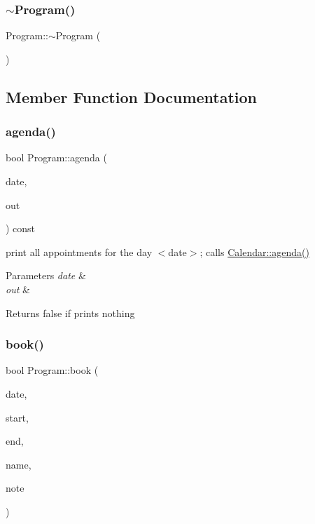 \mbox{\label{classProgram_a986aef1c50e1d338a3315a47ba6df549}} 
\subsubsection{\texorpdfstring{$\sim$\+Program()}{~Program()}}
{\footnotesize\ttfamily Program\+::$\sim$\+Program (\begin{DoxyParamCaption}{ }\end{DoxyParamCaption})}



\subsection{Member Function Documentation}
\mbox{\label{classProgram_a36916661bfce488ed07dbc2a7f3fadce}} 
\subsubsection{\texorpdfstring{agenda()}{agenda()}}
{\footnotesize\ttfamily bool Program\+::agenda (\begin{DoxyParamCaption}\item[{\hyperlink{classDate}{Date} const \&}]{date,  }\item[{std\+::ostream \&}]{out }\end{DoxyParamCaption}) const}

print all appointments for the day $<$date$>$; calls \hyperlink{classCalendar_ac6112aa4e9b3e6e5b9a478ff66789d77}{Calendar\+::agenda()} 
\begin{DoxyParams}{Parameters}
{\em date} & \\
\hline
{\em out} & \\
\hline
\end{DoxyParams}
\begin{DoxyReturn}{Returns}
false if prints nothing 
\end{DoxyReturn}
\mbox{\label{classProgram_a3fd5b4cf3d1eaa58809f593ccdc7a2d3}} 
\subsubsection{\texorpdfstring{book()}{book()}}
{\footnotesize\ttfamily bool Program\+::book (\begin{DoxyParamCaption}\item[{\hyperlink{classDate}{Date} const \&}]{date,  }\item[{\hyperlink{classTime}{Time} const \&}]{start,  }\item[{\hyperlink{classTime}{Time} const \&}]{end,  }\item[{\hyperlink{classString}{String} const \&}]{name,  }\item[{\hyperlink{classString}{String} const \&}]{note }\end{DoxyParamCaption})}

